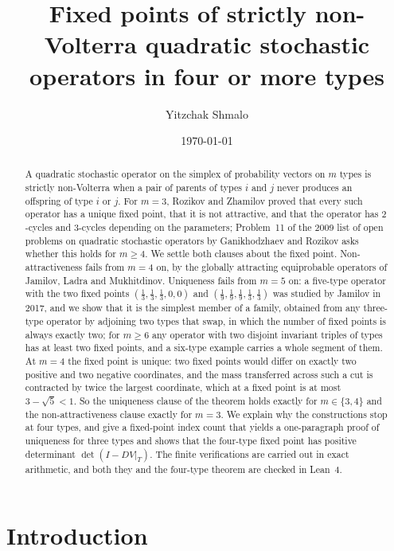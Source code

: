 \documentclass[11pt]{amsart}
\title[Fixed points of strictly non-Volterra operators]{Fixed points of strictly non-Volterra quadratic stochastic operators in four or more types}
\author{Yitzchak Shmalo}
\date{\today}
\theoremstyle{definition}
\begin{document}
\begin{abstract}
A quadratic stochastic operator on the simplex of probability vectors on $m$ types is strictly non-Volterra when a pair of parents of types $i$ and $j$ never produces an offspring of type $i$ or $j$. For $m=3$, Rozikov and Zhamilov proved that every such operator has a unique fixed point, that it is not attractive, and that the operator has $2$-cycles and $3$-cycles depending on the parameters; Problem~11 of the 2009 list of open problems on quadratic stochastic operators by Ganikhodzhaev and Rozikov asks whether this holds for $m\ge4$. We settle both clauses about the fixed point. Non-attractiveness fails from $m=4$ on, by the globally attracting equiprobable operators of Jamilov, Ladra and Mukhitdinov. Uniqueness fails from $m=5$ on: a five-type operator with the two fixed points $(\frac13,\frac13,\frac13,0,0)$ and $(\frac19,\frac19,\frac19,\frac13,\frac13)$ was studied by Jamilov in 2017, and we show that it is the simplest member of a family, obtained from any three-type operator by adjoining two types that swap, in which the number of fixed points is always exactly two; for $m\ge6$ any operator with two disjoint invariant triples of types has at least two fixed points, and a six-type example carries a whole segment of them. At $m=4$ the fixed point is unique: two fixed points would differ on exactly two positive and two negative coordinates, and the mass transferred across such a cut is contracted by twice the largest coordinate, which at a fixed point is at most $3-\sqrt5<1$. So the uniqueness clause of the theorem holds exactly for $m\in\{3,4\}$ and the non-attractiveness clause exactly for $m=3$. We explain why the constructions stop at four types, and give a fixed-point index count that yields a one-paragraph proof of uniqueness for three types and shows that the four-type fixed point has positive determinant $\det(I-DV|_T)$. The finite verifications are carried out in exact arithmetic, and both they and the four-type theorem are checked in Lean~4.
\end{abstract}

\maketitle

\section{Introduction}
\end{document}
